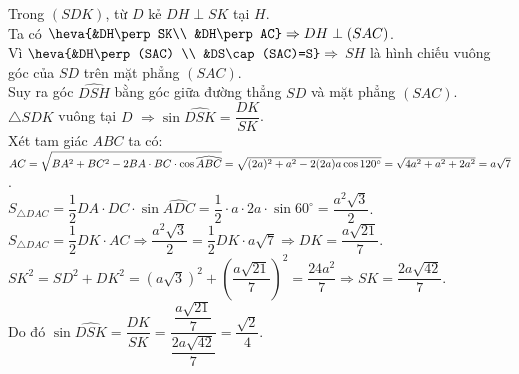 \begin{ex}
{\begin{itemchoice}
			 Trong $(SDK)$, từ $D$ kẻ $DH\perp SK$ tại $H$. \\
			 Ta có $\heva{&DH\perp SK\\
			&DH\perp AC} \Rightarrow DH\perp  (SAC)$. \\
			Vì $\heva{&DH\perp  (SAC) \\
			&DS\cap (SAC)=S} \Rightarrow$ $SH$ là hình  chiếu vuông góc của $SD$ trên mặt phẳng $(SAC)$. \\
			Suy ra góc  $\widehat{DSH}$ bằng góc giữa đường thẳng $SD$ và mặt phẳng $(SAC)$. \\
			$\triangle SDK$ vuông tại $D$ $\Rightarrow \sin  \widehat{DSK}=\dfrac{DK}{SK}$. \\
			Xét tam giác $ABC$ ta có: \\ $AC=\sqrt{BA^2+BC^2-2BA\cdot BC\cdot\cos \widehat{ABC}}=\sqrt{(2a)^2+a^2-2(2a)a\cos 120^\circ} \\ =\sqrt{4a^2+a^2+2a^2}=a\sqrt{7}$. \\ 
			$S_{\triangle DAC}=\dfrac{1}{2}  DA\cdot DC\cdot\sin \widehat{ADC}=\dfrac{1}{2}\cdot a\cdot 2a\cdot\sin 60^\circ=\dfrac{a^2\sqrt{3}}{2}$. \\
			$S_{\triangle DAC}=\dfrac{1}{2}  DK\cdot AC\Rightarrow \dfrac{a^2\sqrt{3}}{2}=\dfrac{1}{2} DK\cdot a\sqrt{7} \Rightarrow DK=\dfrac{a\sqrt{21}}{7}$. \\
			$SK^2=SD^2+DK^2=\left(a\sqrt{3} \right)^2+\left(\dfrac{a\sqrt{21}}{7} \right)^2=\dfrac{24a^2}{7}  \Rightarrow SK=\dfrac{2a\sqrt{42}}{7}$. \\
			Do  đó $\sin \widehat{DSK}=\dfrac{DK}{SK}=\dfrac{\dfrac{a\sqrt{21}}{7}}{\dfrac{2a\sqrt{42}}{7}}=\dfrac{\sqrt{2}}{4}$.
		\end{itemchoice}
	} 
\end{ex}

